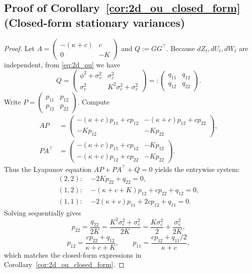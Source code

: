 \subsection*{Proof of Corollary~\ref{cor:2d_ou_closed_form} (Closed-form stationary variances)}
\begin{proof}
Let $A=\begin{pmatrix}-(\kappa+c) & c\\ 0 & -K\end{pmatrix}$ and $Q:=GG^\top$.
Because $dZ_t,dU_t,dW_t$ are independent, from \eqref{eq:2d_ou} we have
\[
Q=\begin{pmatrix}
\phi^2+\sigma_v^2 & \sigma_v^2\\
\sigma_v^2 & K^2\sigma_c^2+\sigma_v^2
\end{pmatrix}
 =: \begin{pmatrix} q_{11} & q_{12}\\ q_{12} & q_{22}\end{pmatrix}.
\]
Write $P=\begin{pmatrix}p_{11}&p_{12}\\ p_{12}&p_{22}\end{pmatrix}$.
Compute
\[
\begin{aligned}
AP&=\begin{pmatrix}
-(\kappa+c)p_{11}+c p_{12} & -(\kappa+c)p_{12}+c p_{22}\\
- K p_{12} & -K p_{22}
\end{pmatrix},\\[2pt]
PA^\top&=\begin{pmatrix}
-(\kappa+c)p_{11}+c p_{12} & -K p_{12}\\
-(\kappa+c)p_{12}+c p_{22} & -K p_{22}
\end{pmatrix}.
\end{aligned}
\]
Thus the Lyapunov equation $AP+PA^\top+Q=0$ yields the entrywise system:
\begin{align*}
(2,2):\;& -2K p_{22}+q_{22}=0,\\
(1,2):\;& -(\kappa+c+K)p_{12}+c p_{22}+q_{12}=0,\\
(1,1):\;& -2(\kappa+c)p_{11}+2c p_{12}+q_{11}=0.
\end{align*}
Solving sequentially gives
\[
p_{22}=\frac{q_{22}}{2K}=\frac{K^2\sigma_c^2+\sigma_v^2}{2K}
=\frac{K\sigma_c^2}{2}+\frac{\sigma_v^2}{2K},
\]
\[
p_{12}=\frac{c p_{22}+q_{12}}{\kappa+c+K},
\qquad
p_{11}=\frac{c p_{12}+q_{11}/2}{\kappa+c},
\]
which matches the closed-form expressions in Corollary~\ref{cor:2d_ou_closed_form}.
\end{proof}

